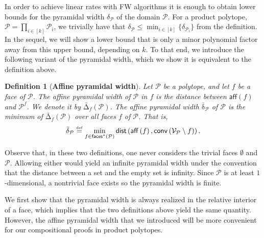 \documentclass{article}
\newcommand\linktoproof[1]{{\normalfont[{\hyperlink{proof:#1}{$\downarrow$}}]}}
\newcommand{\mP}{\mathcal{P}}
\newcommand{\mQ}{\mathcal{Q}}
\newcommand{\verts}[1]{\mathcal{V}_{#1}}
\newcommand{\conv}[1]{\mathsf{conv}\left(#1\right)}
\newcommand{\aff}[1]{\mathsf{aff}\left(#1\right)}
\newcommand{\faces}[1]{{\mathsf{faces}^\ast}\left(#1\right)}
\newcommand{\dist}[1]{\mathsf{dist}\left(#1\right)}
\newcommand{\defi}{\stackrel{\mathrm{\scriptscriptstyle def}}{=}}
\newtheorem{lemma}[theorem]{Lemma}
\newtheorem{definition}[theorem]{Definition}
\newcommand{\what}{\operatorname{\bar{\delta}}}
\newcommand{\whatface}[2]{\operatorname{\bar{\Delta}}_{#1}(#2)}
\begin{document}
In order to achieve linear rates with FW algorithms it is enough to obtain lower bounds for the pyramidal width $\delta_{\mP}$ of the domain $\mP$. For a product polytope, $\mP = \prod_{i\in[k]}\mP_i$, we trivially have that $\delta_{\mP} \leq \min_{i\in[k]}\{\delta_{\mP_i}\}$ from the definition. In the sequel, we will show
a lower bound that is only a minor polynomial factor away from this upper bound, depending on $k$.
To that end, we introduce the following variant of the pyramidal width, which we show it is equivalent to the definition above.
\begin{definition}[\textbf{Affine pyramidal width}]
  Let $\mP$ be a polytope, and let $f$ be a face of $\mP$. The \emph{affine pyramidal width} of $\mP$ in $f$ is the distance between $\aff{f}$ and $\mP^f$. We denote it by $\whatface{f}{\mP}$.
%
  The \emph{affine pyramidal width} $\what_{\mP}$ of $\mP$ is the minimum of $\whatface{f}{\mP}$ over all faces $f$ of $\mP$. That is,
\begin{equation}\label{eq:affine_pyrwidth_X}
    \what_{\mP} \defi \min_{f \in \faces{\mP}} \dist{\aff{f}, \conv{\verts{\mP} \setminus f}}.
    \vspace{0.3cm}
\end{equation}
\end{definition}

Observe that, in these two definitions, one never considers the trivial faces $\emptyset$ and $\mP$. Allowing either would yield an infinite pyramidal width under the convention that the distance between a set and the empty set is infinity. Since $\mP$ is at least $1$-dimensional, a nontrivial face exists so the pyramidal width is finite.

We first show that the pyramidal width is always realized in the relative interior of a face, which implies that the two definitions above yield the same quantity. However, the affine pyramidal width that we introduced will be more convenient for our compositional proofs in product polytopes.
\end{document}
